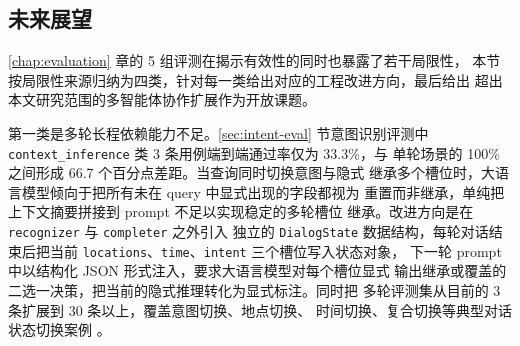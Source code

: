 
\subsection{未来展望}
\label{sec:future-work}

\ref{chap:evaluation} 章的 5 组评测在揭示有效性的同时也暴露了若干局限性，
本节按局限性来源归纳为四类，针对每一类给出对应的工程改进方向，最后给出
超出本文研究范围的多智能体协作扩展作为开放课题。

第一类是多轮长程依赖能力不足。\ref{sec:intent-eval} 节意图识别评测中
\texttt{context\_\bk{}inference} 类 3 条用例端到端通过率仅为 33.3\%，与
单轮场景的 100\% 之间形成 66.7 个百分点差距。当查询同时切换意图与隐式
继承多个槽位时，大语言模型倾向于把所有未在 query 中显式出现的字段都视为
重置而非继承，单纯把上下文摘要拼接到 prompt 不足以实现稳定的多轮槽位
继承。改进方向是在 \texttt{recognizer} 与 \texttt{completer} 之外引入
独立的 \texttt{DialogState} 数据结构，每轮对话结束后把当前
\texttt{locations}、\texttt{time}、\texttt{intent} 三个槽位写入状态对象，
下一轮 prompt 中以结构化 JSON 形式注入，要求大语言模型对每个槽位显式
输出继承或覆盖的二选一决策，把当前的隐式推理转化为显式标注。同时把
多轮评测集从目前的 3 条扩展到 30 条以上，覆盖意图切换、地点切换、
时间切换、复合切换等典型对话状态切换案例 \cite{ref29}。

